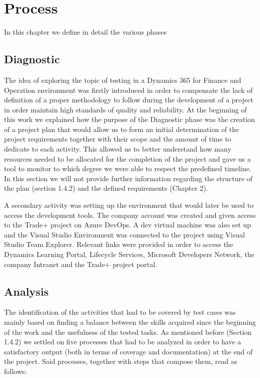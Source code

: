 \chapter{Process}

In this chapter we define in detail the various phases 

\section{Diagnostic} 

The idea of exploring the topic of testing in a Dynamics 365 for Finance and Operation environment was firstly introduced in order to compensate the lack of definition of a proper methodology to follow during the development of a project in order maintain high standards of quality and reliability. 
At the beginning of this work we explained how the purpose of the Diagnostic phase was the creation of a project plan that would allow us to form an initial determination of the project requirements together with their scope and the amount of time to dedicate to each activity. This allowed us to better understand how many resources needed to be allocated for the completion of the project and gave us a tool to monitor to which degree we were able to respect the predefined timeline. In this section we will not provide further information regarding the structure of the plan (section 1.4.2) and the defined requirements (Chapter 2).

A secondary activity was setting up the environment that would later be used to access the development tools. The company account was created and given access to the Trade+ project on Azure DevOps. A dev virtual machine was also set up and the Visual Studio Environment was connected to the project using Visual Studio Team Explorer. Relevant links were provided in order to access the Dynamics Learning Portal, Lifecycle Services, Microsoft Developers Network, the company Intranet and the Trade+ project portal.

\section{Analysis} 

The identification of the activities that had to be covered by test cases was mainly based on finding a balance between the skills acquired since the beginning of the work and the usefulness of the tested tasks. As mentioned before (Section 1.4.2) we settled on five processes that had to be analyzed in order to have a satisfactory output (both in terms of coverage and documentation) at the end of the project. Said processes, together with steps that compose them, read as follows:

